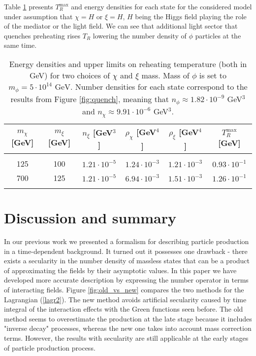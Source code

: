 \documentclass[twocolumn,showpacs,preprintnumbers,amsmath,amssymb,nofootinbib,superscriptaddress,prc]{revtex4}
\begin{document}
Table \ref{tab:2} presents $T_R^{\text{max}}$ and energy densities for each state for the considered model under assumption that $\chi = H$ or $\xi = H$, $H$ being the Higgs field playing the role of the mediator or the light field. We can see that additional light sector that quenches preheating rises $T_R$ lowering the number density of $\phi$ particles at the same time.

\begin{table}[t]
\caption{Energy densities and upper limits on reheating temperature (both in GeV) for two choices of $\chi$ and $\xi$ mass. Mass of $\phi$ is set to \mbox{$m_{\phi} = 5 \cdot 10^{14} \text{ GeV}$}. Number densities for each state correspond to the results from Figure \ref{fig:quench}, meaning that $n_{\phi} \approx 1.82 \cdot 10^{-9}$ GeV$^3$ and $n_{\chi} \approx 9.91 \cdot 10^{-6}$ GeV$^3$.}
\label{tab:2}
\begin{tabular}{cccccc}
\hline \hline
     $m_{\chi}$ [GeV] & $m_{\xi}$ [GeV]  & $n_{\xi}$ [GeV$^3$] & $\rho_{\chi}$ [GeV$^4$] & $\rho_{\xi}$ [GeV$^4$] & $T_R^{\text{max}}$ [GeV] \\
\hline  
&  &   &  &  &  \\
    125 & 100 & $1.21 \cdot 10^{-5}$ & $1.24 \cdot 10^{-3}$ & $1.21 \cdot 10^{-3}$ & $0.93 \cdot 10^{-1}$ \\
  700 & 125 & $1.21 \cdot 10^{-5}$ & $6.94 \cdot 10^{-3}$ & $1.51 \cdot 10^{-3}$ & $1.26 \cdot 10^{-1}$ \\
 &  &  &   &  &  \\ 
  \hline \hline
    \end{tabular}
\end{table}

\section{Discussion and summary \label{sec_disc}}
	
In our previous work \cite{Enomoto:2014cna} we presented a formalism for describing particle production in a time-dependent background. It turned out it possesses one drawback - there exists a secularity in the number density of massless states that can be a product of approximating the fields by their asymptotic values. In this paper we have developed more accurate description by expressing the number operator in terms of interacting fields. Figure \ref{fig:old_vs_new} compares the two methods for the Lagrangian (\ref{lagr2}). The new method avoids artificial secularity caused by time integral of the interaction effects with the Green functions seen before. The old method seems to overestimate the production at the late stage because it includes "inverse decay" processes, whereas the new one takes into account mass correction terms. However, the results with secularity are still applicable at the early stages of particle production process. 
\end{document}
